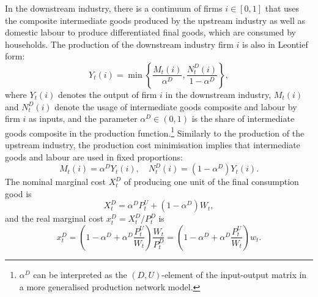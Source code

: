 \documentclass[a4paper, 12pt]{article}
\theoremstyle{definition*}
\begin{document}
In the downstream industry, there is a continuum of firms $i \in [0,1]$ that uses the composite intermediate goods produced by the upstream industry as well as domestic labour to produce differentiated final goods, which are consumed by households.
The production of the downstream industry firm $i$ is also in Leontief form:
\begin{equation}
  Y_t(i) = \min\left\{\frac{M_t(i)}{\alpha^D}, \frac{N^D_t(i)}{1 - \alpha^D}\right\},
\end{equation}
where $Y_t(i)$ denotes the output of firm $i$ in the downstream industry, $M_t(i)$ and $N^D_t(i)$ denote the usage of intermediate goods composite and labour by firm $i$ as inputs, and the parameter $\alpha^D \in (0,1)$ is the share of intermediate goods composite in the production function.\footnote{$\alpha^D$ can be interpreted as the $(D, U)$-element of the input-output matrix in a more generalised production network model.}
Similarly to the production of the upstream industry, the production cost minimisation implies that intermediate goods and labour are used in fixed proportions:
\begin{equation}
  M_t(i) = \alpha^D Y_t(i), \quad N^D_t(i) = (1 - \alpha^D)Y_t(i).
\end{equation}
The nominal marginal cost $X^D_t$ of producing one unit of the final consumption good is
\begin{equation}
  X^D_t = \alpha^D P^U_t + (1 - \alpha^D)W_t,
\end{equation}
and the real marginal cost $x^D_t = X^D_t / P^D_t$ is
\begin{equation}\label{eq:rmcD}
  x^D_t = \left(1 - \alpha^D + \alpha^D\frac{P^U_t}{W_t}\right)\frac{W_t}{P^D_t} = \left(1 - \alpha^D + \alpha^D\frac{P^U_t}{W_t}\right)w_t.
\end{equation}
\end{document}
